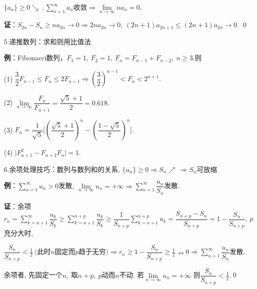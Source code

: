 \documentclass[UTF8]{ctexart}
\newcommand\no{\noindent}
\newcommand\dis{\displaystyle}
\newcommand\ls{\leqslant}
\newcommand\gs{\geqslant}
\newcommand\limn{\dis\lim\limits_{n\to\infty}}
\newcommand\sumn{\dis\sum\limits_{n=1}^{\infty}}
\begin{document}
\begin{spacing}{2}
$\{a_n\}\gs0\searrow\ ,\sumn a_n$收敛$\Longrightarrow\limn na_n=0.$

\textbf{证}：$S_{2n}-S_n\gs na_{2n}\longrightarrow0\Longrightarrow 2na_{2n}
\longrightarrow0,\ (2n+1)a_{2n+1}\ls(2n+1)a_{2n}\longrightarrow0.$
\qed

\no5.递推数列：求和则用比值法

\textbf{例}：Fibonacci数列，$F_1=1,\ F_2=1,\ F_n=F_{n-1}+F_{n-2},\ n\gs3.$则

(1) $\dfrac{3}{2}F_{n-1}\ls F_n\ls2F_{n-1}\Longrightarrow
\left(\dfrac{3}{2}\right)^{n-1}<F_n<2^{n+1}.$

\vspace{0.2cm}

(2) $\limn\dfrac{F_n}{F_{n+1}}=\dfrac{\sqrt{5}+1}{2}=0.618.$

\vspace{0.2cm}

(3) $F_n=\dfrac{1}{\sqrt{5}}\Bigg[\left(\dfrac{\sqrt{5}+1}{2}\right)^n-\left(\dfrac{1-\sqrt{5}}{2}\right)^n\Bigg].$

\vspace{0.2cm}

(4) $\Big|F_{n+1}^2-F_{n+2}F_n\Big|=1.$

\no6.余项处理技巧：数列与数列和的关系, 
$\{u_n\}\gs0\Longrightarrow S_n\nearrow\ \Longrightarrow S_n$可放缩

\textbf{例}：$\sumn u_n>0$发散$,\ \limn u_n=+\infty
\Longrightarrow\sumn \dfrac{u_n}{S_n}$发散.

\vspace{0.2cm}

\textbf{证}：余项$\dis r_n=\sum\limits_{k=n+1}^\infty\dfrac{u_k}{S_k}\gs
\sum\limits_{k=n+1}^{n+p}\dfrac{u_k}{S_k}\gs
\dfrac{1}{S_{n+p}}\sum\limits_{k=n+1}^{n+p}u_k
=\dfrac{S_{n+p}-S_n}{S_{n+p}}=1-\dfrac{S_n}{S_{n+p}},\ 
p$充分大时,

\vspace{0.2cm}

$\dis\dfrac{S_n}{S_{n+p}}<\frac{1}{2}\ \Big(\text{此时}n\text{固定而}p\text{趋于无穷}\Big)
\Longrightarrow
r_n\gs1-\dfrac{S_n}{S_{n+p}}\gs\frac{1}{2}\nrightarrow0
\Longrightarrow\sumn \dfrac{u_n}{S_n}$发散.

\vspace{0.2cm}

余项者, 先固定一个$n,\ $取$n+p,\ p$动而$n$不动. 若$\limn u_n=+\infty$
则$\dis\dfrac{S_n}{S_{n+p}}<\frac{1}{2}.$\qed

\vspace{0.2cm}


\end{spacing}
\end{document}
